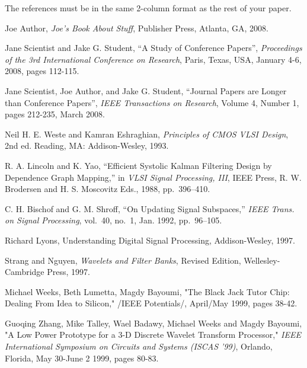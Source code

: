 \documentclass[final]{ieee}
\begin{document}
The references must be in the same 2-column format as the rest of your
paper.



\begin{thebibliography}{99}

   Joe Author, {\it Joe's Book About Stuff}, Publisher Press,
  Atlanta, GA, 2008.
  
   Jane Scientist and Jake G. Student, 
   ``A Study of Conference Papers'', {\it Proceedings of the 3rd International
    Conference on Research}, Paris, Texas, USA, January 4-6, 2008, pages 112-115.
    
     Jane Scientist, Joe Author, and Jake G. Student,
    ``Journal Papers are Longer than Conference Papers'', 
    {\it IEEE Transactions on Research}, Volume 4, Number 1, pages 212-235,
    March 2008.
  
  
   Neil H. E. Weste and Kamran Eshraghian, {\it Principles
  of CMOS VLSI Design}, 2nd ed. Reading, MA: Addison-Wesley, 1993.

   R. A. Lincoln and K. Yao, ``Efficient Systolic Kalman
  Filtering Design by Dependence Graph Mapping,'' in {\it VLSI Signal
  Processing, III}, IEEE Press, R. W. Brodersen and H. S. Moscovitz Eds.,
  1988, pp.~396--410.

   C. H. Bischof and G. M. Shroff, ``On Updating Signal
  Subspaces,'' {\it IEEE Trans. on Signal Processing}, vol.~40, no.~1,
   Jan. 1992, pp.~96--105.

   Richard Lyons, {Understanding Digital Signal Processing},
Addison-Wesley, 1997.

   Strang and Nguyen, {\it Wavelets and Filter Banks}, Revised
Edition, Wellesley-Cambridge Press, 1997.

 Michael Weeks, Beth Lumetta, Magdy Bayoumi, "The Black Jack
Tutor Chip: Dealing From Idea to Silicon," /IEEE Potentials/, April/May
1999, pages 38-42.

 Guoqing Zhang, Mike Talley, Wael Badawy, Michael Weeks and
Magdy Bayoumi, "A Low Power Prototype for a 3-D Discrete Wavelet
Transform Processor," {\it IEEE International Symposium on Circuits and
Systems (ISCAS '99)}, Orlando, Florida, May 30-June 2 1999, pages 80-83.


\end{thebibliography}
\end{document}
